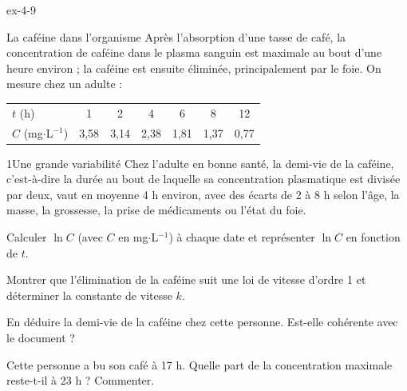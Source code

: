 \begin{blocLivre}{ex-4-9}
\begin{exercice}[2]{La caféine dans l'organisme}
Après l'absorption d'une tasse de café, la concentration de caféine dans le plasma sanguin est maximale au bout
d'une heure environ ; la caféine est ensuite éliminée, principalement par le foie. On mesure chez un adulte :
\begin{center}\small\renewcommand{\arraystretch}{1.2}
\begin{tabular}{@{}l*{6}{c}@{}}\toprule
$t$ (h) & 1 & 2 & 4 & 6 & 8 & 12\\
$C$ (mg$\cdot$L$^{-1}$) & 3,58 & 3,14 & 2,38 & 1,81 & 1,37 & 0,77\\\bottomrule
\end{tabular}\end{center}
\begin{docu}{1}{Une grande variabilité}
Chez l'adulte en bonne santé, la demi-vie de la caféine, c'est-à-dire la durée au bout de laquelle sa concentration
plasmatique est divisée par deux, vaut en moyenne 4 h environ, avec des écarts de 2 à 8 h selon l'âge, la masse,
la grossesse, la prise de médicaments ou l'état du foie.
\end{docu}
\begin{questions}
\item Calculer $\ln C$ (avec $C$ en mg$\cdot$L$^{-1}$) à chaque date et représenter $\ln C$ en fonction de $t$.
\item Montrer que l'élimination de la caféine suit une loi de vitesse d'ordre 1 et déterminer la constante de vitesse $k$.
\item En déduire la demi-vie de la caféine chez cette personne. Est-elle cohérente avec le document ?
\item Cette personne a bu son café à 17 h. Quelle part de la concentration maximale reste-t-il à 23 h ? Commenter.
\end{questions}
\end{exercice}
\end{blocLivre}
